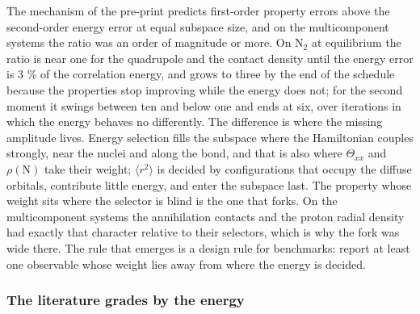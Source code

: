 \documentclass[11pt]{article}
\begin{document}
The mechanism of the pre-print \cite{ECGseedingSQD} predicts first-order property errors above the second-order energy error at equal subspace size, and on the multicomponent systems the ratio was an order of magnitude or more. On N$_2$ at equilibrium the ratio is near one for the quadrupole and the contact density until the energy error is 3 \% of the correlation energy, and grows to three by the end of the schedule because the properties stop improving while the energy does not; for the second moment it swings between ten and below one and ends at six, over iterations in which the energy behaves no differently. The difference is where the missing amplitude lives. Energy selection fills the subspace where the Hamiltonian couples strongly, near the nuclei and along the bond, and that is also where $\Theta_{xx}$ and $\rho(\mathrm{N})$ take their weight; $\langle r^{2}\rangle$ is decided by configurations that occupy the diffuse orbitals, contribute little energy, and enter the subspace last. The property whose weight sits where the selector is blind is the one that forks. On the multicomponent systems the annihilation contacts and the proton radial density had exactly that character relative to their selectors, which is why the fork was wide there. The rule that emerges is a design rule for benchmarks: report at least one observable whose weight lies away from where the energy is decided.

\subsubsection{The literature grades by the energy}\label{sec:3.7.3}
\end{document}
